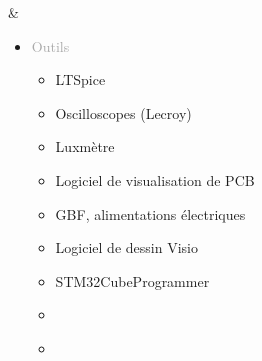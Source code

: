 \documentclass{article}
\begin{document}
\begin{tabular}
\begin{itemize}[label={}, topsep=8pt, partopsep=0pt, itemsep=0.5pt, parsep=2pt, after=\vspace*{-\baselineskip}]
\begin{itemize}[label={\textcolor{gray!100}{$\checkmark$}}, topsep=8pt, partopsep=0pt, itemsep=0.5pt, parsep=2pt]
        \end{itemize}
    \end{itemize}
    &
    \begin{itemize}[label={}, topsep=8pt, partopsep=0pt, itemsep=0.5pt, parsep=2pt, after=\vspace*{-\baselineskip}]
        \setlength{\itemsep}{10pt} 
        \item \textcolor{darkGray}{Outils}
        \begin{itemize}[label={\textcolor{gray!100}{\checkmark}}, topsep=8pt, partopsep=0pt, itemsep=0.5pt, parsep=2pt] 
            \item \textcolor{gray!100}{LTSpice}
            \item \textcolor{gray!100}{Oscilloscopes (Lecroy)}
            \item \textcolor{gray!100}{Luxmètre}
            \item \textcolor{gray!100}{Logiciel de visualisation de PCB}
            \item \textcolor{gray!100}{GBF, alimentations électriques}
            \item \textcolor{gray!100}{Logiciel de dessin Visio}
            \item \textcolor{gray!100}{STM32CubeProgrammer}
            \item[\textcolor{white}{\checkmark}] \textcolor{gray!100}{} %
            \item[\textcolor{white}{\checkmark}] \textcolor{gray!100}{} %
        \end{itemize}
    \end{itemize}
\end{tabular}

\begin{center}
\end{center}

\end{document}
